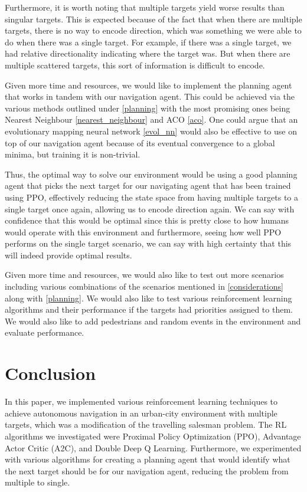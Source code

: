 \documentclass{article}
\begin{document}
	Furthermore, it is worth noting that multiple targets yield worse results than singular targets. This is expected because of the fact that when there are multiple targets, there is no way to encode direction, which was something we were able to do when there was a single target. For example, if there was a single target, we had relative directionality indicating where the target was. But when there are multiple scattered targets, this sort of information is difficult to encode. 
	
	Given more time and resources, we would like to implement the planning agent that works in tandem with our navigation agent. This could be achieved via the various methods outlined under \ref{planning} with the most promising ones being Nearest Neighbour \ref{nearest_neighbour} and ACO \ref{aco}. One could argue that an evolutionary mapping neural network \ref{evol_nn} would also be effective to use on top of our navigation agent because of its eventual convergence to a global minima, but training it is non-trivial.
	
	Thus, the optimal way to solve our environment would be using a good planning agent that picks the next target for our navigating agent that has been trained using PPO, effectively reducing the state space from having multiple targets to a single target once again, allowing us to encode direction again. We can say with confidence that this would be optimal since this is pretty close to how humans would operate with this environment and furthermore, seeing how well PPO performs on the single target scenario, we can say with high certainty that this will indeed provide optimal results.
	
	Given more time and resources, we would also like to test out more scenarios including various combinations of the scenarios mentioned in \ref{considerations} along with \ref{planning}. We would also like to test various reinforcement learning algorithms and their performance if the targets had priorities assigned to them. We would also like to add pedestrians and random events in the environment and evaluate performance.
	
	\section{Conclusion}
	In this paper, we implemented various reinforcement learning techniques to achieve autonomous navigation in an urban-city environment with multiple targets, which was a modification of the travelling salesman problem. The RL algorithms we investigated were Proximal Policy Optimization (PPO), Advantage Actor Critic (A2C), and Double Deep Q Learning. Furthermore, we experimented with various algorithms for creating a planning agent that would identify what the next target should be for our navigation agent, reducing the problem from multiple to single.
	
\end{document}
